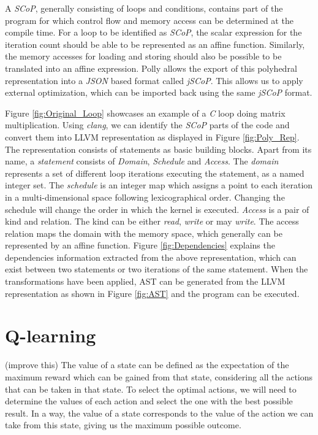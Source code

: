 \documentclass[logo,msc]{infthesis}           %
\begin{document}
A \textit{SCoP}, generally consisting of loops and conditions, contains part of the program for which control flow and memory access can be determined at the compile time. For a loop to be identified as \textit{SCoP}, the scalar expression for the iteration count should be able to be represented as an affine function. Similarly, the memory accesses for loading and storing should also be possible to be translated into an affine expression. Polly allows the export of this polyhedral representation into a \textit{JSON} based format called \textit{jSCoP}.
This allows us to apply external optimization, which can be imported back using the same \textit{jSCoP} format.

 Figure \ref{fig:Original_Loop} showcases an example of a \textit{C} loop doing matrix multiplication. Using \textit{clang}, we can identify the \textit{SCoP} parts of the code and convert them into LLVM representation as displayed in Figure \ref{fig:Poly_Rep}. The representation consists of statements as basic building blocks. Apart from its name, a \textit{statement} consists of \textit{Domain}, \textit{Schedule} and \textit{Access}. The \textit{domain} represents a set of different loop iterations executing the statement, as a named integer set. The \textit{schedule} is an integer map which assigns a point to each iteration in a multi-dimensional space following lexicographical order. Changing the schedule will change the order in which the kernel is executed. \textit{Access} is a pair of kind and relation. The kind can be either \textit{read}, \textit{write} or may \textit{write}. The access relation maps the domain with the memory space, which generally can be represented by an affine function. Figure \ref{fig:Dependencies} explains the dependencies information extracted from the above representation, which can exist between two statements or two iterations of the same statement. When the transformations have been applied, AST can be generated from the LLVM representation as shown in Figure \ref{fig:AST} and the program can be executed.

 \section{Q-learning}

 (improve this) The value of a state can be defined as the expectation of the maximum reward which can be gained from that state, considering all the actions that can be taken in that state. To select the optimal actions, we will need to determine the values of each action and select the one with the best possible result. In a way, the value of a state corresponds to the value of the action we can take from this state, giving us the maximum possible outcome.
\end{document}
